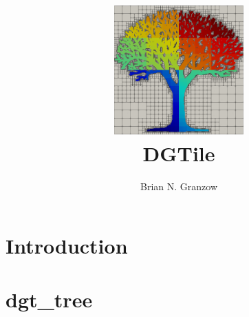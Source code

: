 \documentclass[12pt]{report}
\title{\includegraphics[width=5cm]{../logo.png}\\DGTile}
\author{Brian N. Granzow}
\date{}
\begin{document}
\maketitle

\chapter{Introduction}

\chapter{dgt\_tree}

\end{document}
